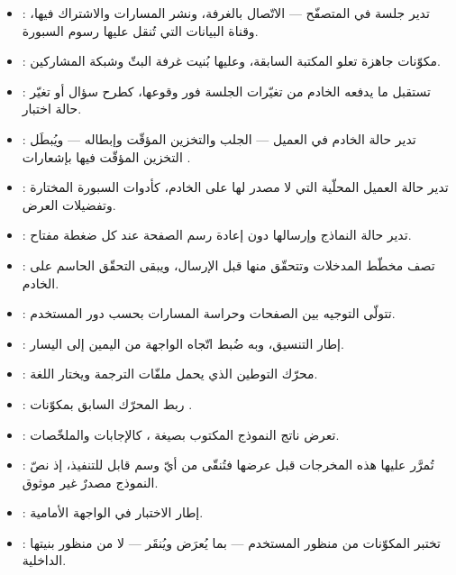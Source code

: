 \begin{itemize}
  \item \textbf{}: تدير جلسة  في المتصفّح — الاتّصال بالغرفة، ونشر المسارات والاشتراك فيها، وقناة البيانات التي تُنقل عليها رسوم السبورة.

  \item \textbf{}: مكوّنات جاهزة تعلو المكتبة السابقة، وعليها بُنيت غرفة البثّ وشبكة المشاركين.

  \item \textbf{}: تستقبل ما يدفعه الخادم من تغيّرات الجلسة فور وقوعها، كطرح سؤال أو تغيّر حالة اختبار.

  \item \textbf{}: تدير حالة الخادم في العميل — الجلب والتخزين المؤقّت وإبطاله — ويُبطَل التخزين المؤقّت فيها بإشعارات .

  \item \textbf{}: تدير حالة العميل المحلّية التي لا مصدر لها على الخادم، كأدوات السبورة المختارة وتفضيلات العرض.

  \item \textbf{}: تدير حالة النماذج وإرسالها دون إعادة رسم الصفحة عند كل ضغطة مفتاح.

  \item \textbf{}: تصف مخطّط المدخلات وتتحقّق منها قبل الإرسال، ويبقى التحقّق الحاسم على الخادم.

  \item \textbf{}: تتولّى التوجيه بين الصفحات وحراسة المسارات بحسب دور المستخدم.

  \item \textbf{}: إطار التنسيق، وبه ضُبط اتّجاه الواجهة من اليمين إلى اليسار.

  \item \textbf{}: محرّك التوطين الذي يحمل ملفّات الترجمة ويختار اللغة.

  \item \textbf{}: ربط المحرّك السابق بمكوّنات .

  \item \textbf{}: تعرض ناتج النموذج المكتوب بصيغة ، كالإجابات والملخّصات.

  \item \textbf{}: تُمرَّر عليها هذه المخرجات قبل عرضها فتُنقّى من أيّ وسم قابل للتنفيذ، إذ نصّ النموذج مصدرٌ غير موثوق.

  \item \textbf{}: إطار الاختبار في الواجهة الأمامية.

  \item \textbf{}: تختبر المكوّنات من منظور المستخدم — بما يُعرَض ويُنقَر — لا من منظور بنيتها الداخلية.
\end{itemize}

